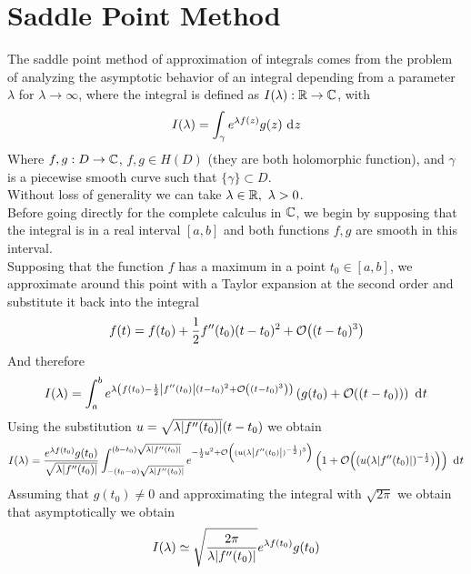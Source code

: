 \documentclass[../qm.tex]{subfiles}
\begin{document}
	\section{Saddle Point Method}
	The saddle point method of approximation of integrals comes from the problem of analyzing the asymptotic behavior of an integral depending from a parameter $\lambda$ for $\lambda\to\infty$, where the integral is defined as $I(\lambda):\mathbb{R}\to\mathbb{C}$, with
	\begin{equation}
		I(\lambda)=\int_{\gamma}e^{\lambda f(z)}g(z)\ \mathrm{d}^{}z
		\label{eq:saddlepointintegral}
	\end{equation}
	Where $f,g:D\to\mathbb{C}$, $f,g\in H(D)$ (they are both holomorphic function), and $\gamma$ is a piecewise smooth curve such that $\{\gamma\}\subset D$.\\
	Without loss of generality we can take $\lambda\in\mathbb{R},\ \lambda>0$.\\
	Before going directly for the complete calculus in $\mathbb{C}$, we begin by supposing that the integral is in a real interval $[a,b]$ and both functions $f,g$ are smooth in this interval.\\
	Supposing that the function $f$ has a maximum in a point $t_0\in[a,b]$, we approximate around this point with a Taylor expansion at the second order and substitute it back into the integral
	\begin{equation*}
		f(t)=f(t_0)+\frac{1}{2}f''(t_0)(t-t_0)^2+\order{(t-t_0)^3}
	\end{equation*}
	And therefore
	\begin{equation}
		I(\lambda)=\int_{a}^{b}e^{\lambda\left( f(t_0)-\frac{1}{2}\abs{f''(t_0)}(t-t_0)^2+\order{(t-t_0)^3} \right)}\left( g(t_0)+\order{(t-t_0)} \right)\diff{t}
		\label{eq:Ilambdareal2ord}
	\end{equation}
	Using the substitution $u=\sqrt{\lambda\abs{f''(t_0)}}(t-t_0)$ we obtain
	\begin{equation}
		I(\lambda)=\frac{e^{\lambda f(t_0)}g(t_0)}{\sqrt{\lambda\abs{f''(t_0)}}}\int_{-(t_0-a)\sqrt{\lambda\abs{f''(t_0)}}}^{(b-t_0)\sqrt{\lambda\abs{f''(t_0)}}}e^{-\frac{1}{2}u^2+\order{(u(\lambda\abs{f''(t_0)})^{-\frac{1}{2}})^3}}\left( 1+\order{(u(\lambda\abs{f''(t_0)})^{-\frac{1}{2}})} \right)\diff{t}
		\label{eq:integralapproximated}
	\end{equation}
	Assuming that $g(t_0)\ne0$ and approximating the integral with $\sqrt{2\pi}$ we obtain that asymptotically we obtain
	\begin{equation}
		I(\lambda)\simeq\sqrt{\frac{2\pi}{\lambda\abs{f''(t_0)}}}e^{\lambda f(t_0)}g(t_0)
		\label{eq:Ilambdaapproximatedreal}
	\end{equation}
\end{document}
